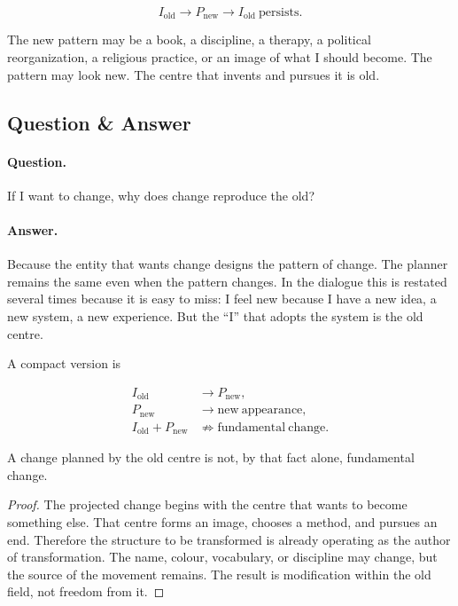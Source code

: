 \begin{equation}
I_{\mathrm{old}}
\longrightarrow
P_{\mathrm{new}}
\longrightarrow
I_{\mathrm{old}}\ \mathrm{persists}.
\end{equation}

The new pattern may be a book, a discipline, a therapy, a political reorganization, a religious practice, or an image of what I should become. The pattern may look new. The centre that invents and pursues it is old.

\subsection{Question \& Answer}

\paragraph{Question.}
If I want to change, why does change reproduce the old?

\paragraph{Answer.}
Because the entity that wants change designs the pattern of change. The planner remains the same even when the pattern changes. In the dialogue this is restated several times because it is easy to miss: I feel new because I have a new idea, a new system, a new experience. But the ``I'' that adopts the system is the old centre.

A compact version is

\begin{align}
I_{\mathrm{old}} &\longrightarrow P_{\mathrm{new}},\\
P_{\mathrm{new}} &\longrightarrow \mathrm{new\ appearance},\\
I_{\mathrm{old}}+P_{\mathrm{new}} &\not\Rightarrow \mathrm{fundamental\ change}.
\end{align}

\begin{proposition}
A change planned by the old centre is not, by that fact alone, fundamental change.
\end{proposition}

\begin{proof}
The projected change begins with the centre that wants to become something else. That centre forms an image, chooses a method, and pursues an end. Therefore the structure to be transformed is already operating as the author of transformation. The name, colour, vocabulary, or discipline may change, but the source of the movement remains. The result is modification within the old field, not freedom from it.
\end{proof}

